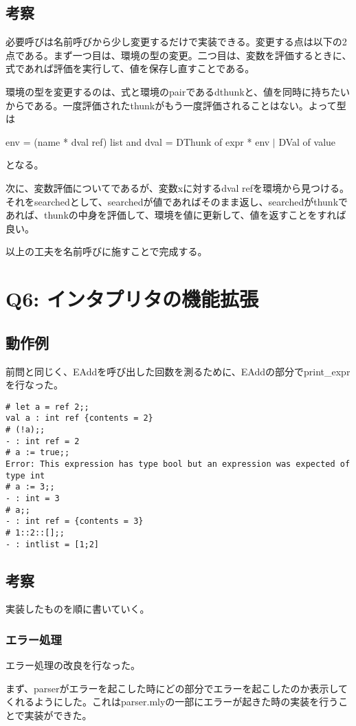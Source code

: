 \documentclass[uplatex,12pt]{jsarticle}
\begin{document}
\subsection{考察}
必要呼びは名前呼びから少し変更するだけで実装できる。変更する点は以下の2点である。まず一つ目は、環境の型の変更。二つ目は、変数を評価するときに、式であれば評価を実行して、値を保存し直すことである。

環境の型を変更するのは、式と環境のpairであるdthunkと、値を同時に持ちたいからである。一度評価されたthunkがもう一度評価されることはない。よって型は

env = (name * dval ref) list and dval = DThunk of expr * env $\mid$ DVal of value

となる。

次に、変数評価についてであるが、変数xに対するdval refを環境から見つける。それをsearchedとして、searchedが値であればそのまま返し、searchedがthunkであれば、thunkの中身を評価して、環境を値に更新して、値を返すことをすれば良い。

以上の工夫を名前呼びに施すことで完成する。

\section{Q6: インタプリタの機能拡張}
\subsection{動作例}
前問と同じく、EAddを呼び出した回数を測るために、EAddの部分でprint\_exprを行なった。
\begin{lstlisting}[caption=動作例]
# let a = ref 2;;
val a : int ref {contents = 2}
# (!a);;
- : int ref = 2
# a := true;;
Error: This expression has type bool but an expression was expected of type int
# a := 3;;
- : int = 3
# a;;
- : int ref = {contents = 3}
# 1::2::[];;
- : intlist = [1;2]
\end{lstlisting}
\subsection{考察}
実装したものを順に書いていく。
\subsubsection{エラー処理}
エラー処理の改良を行なった。

まず、parserがエラーを起こした時にどの部分でエラーを起こしたのか表示してくれるようにした。これはparser.mlyの一部にエラーが起きた時の実装を行うことで実装ができた。
\end{document}
